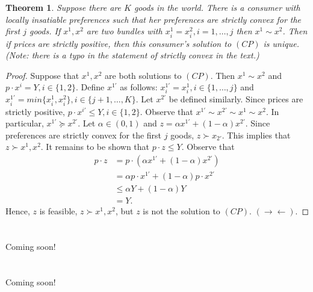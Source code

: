 \documentclass[12pt]{article}
\newtheorem{thm}{Theorem}[section]
\theoremstyle{definition}
\theoremstyle{remark}
\def\contra{\rightarrow \leftarrow}
\begin{document}
\section{}
\begin{thm}
  Suppose there are $K$ goods in the world. There is a consumer with locally insatiable preferences such that her preferences are strictly convex for the first $j$ goods. If $x^1, x^2$ are two bundles with $x^1_i = x^2_i, i = 1, \ldots, j$ then $x^1 \sim x^2$. Then if prices are strictly positive, then this consumer's solution to $(CP)$ is unique. (Note: there is a typo in the statement of strictly convex in the text.)
\end{thm}
\begin{proof}
  Suppose that $x^1, x^2$ are both solutions to $(CP)$. Then $x^1 \sim x^2$ and $p \cdot x^i = Y, i \in \{ 1, 2 \}$. Define $x^{1'}$ as follows: $x^{1'}_i = x^1_i, i \in \{ 1, \dots, j \}$ and $x^{1'}_i = min \{ x^1_i, x^2_i \}, i \in \{ j+1, \ldots, K \}$.
  Let $x^{2'}$ be defined similarly. Since prices are strictly positive, $p \cdot x^{i'} \leq Y, i \in \{ 1, 2 \}$. Observe that $x^{1'} \sim x^{2'} \sim x^1 \sim x^2$. In particular, $x^{1'} \succeq x^{2'}$. Let $\alpha \in (0,1)$ and $z = \alpha x^{1'} + (1 - \alpha)x^{2'}$.
  Since preferences are strictly convex for the first $j$ goods, $z \succ x_{2'}$. This implies that $z \succ x^1, x^2$.  It remains to be shown that $p \cdot z \leq Y$. Observe that
  \begin{align*}
    p \cdot z &= p \cdot (\alpha x^{1'} + (1 - \alpha)x^{2'}) \\
    &= \alpha p \cdot x^{1'} + (1 - \alpha) p \cdot x^{2'} \\
    &\leq \alpha Y + (1 - \alpha) Y \\
    &= Y.
  \end{align*}
  Hence, $z$ is feasible, $z \succ x^1, x^2$, but $z$ is not the solution to $(CP)$. $(\contra)$.
\end{proof}
%
%
\section{}
Coming soon!
%
%
\section{}
Coming soon!
%
%
\end{document}

